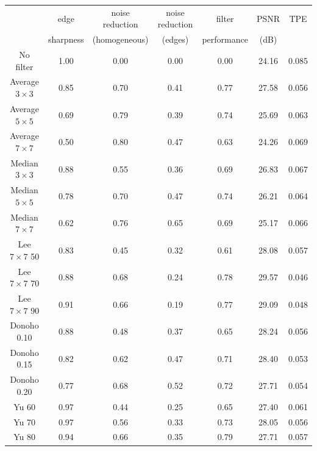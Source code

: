 \documentclass[12pt]{report}
\renewcommand{\baselinestretch}{1.5}
\begin{document}
\begin{table}[p]
\setlength{\abovecaptionskip}{-0.25cm}
\renewcommand{\baselinestretch}{1.0}
\begin{center}
\begin{scriptsize}
\begin{tabular}{|c|c|c|c|c|c|c|} \hline
			& edge		& noise reduction & noise reduction 	& filter& PSNR 		& TPE	\\
			& sharpness	& (homogeneous)	  & (edges)		& performance & (dB)	&	\\ \hline \hline

No filter		& 1.00	& 0.00		& 0.00		& 0.00	& 24.16		& 0.085		\\ \hline \hline

Average $3 \times 3$	& 0.85	& 0.70		& 0.41		& 0.77	& 27.58		& 0.056		\\ \hline
Average $5 \times 5$	& 0.69	& 0.79		& 0.39		& 0.74	& 25.69		& 0.063		\\ \hline
Average $7 \times 7$	& 0.50	& 0.80		& 0.47		& 0.63	& 24.26		& 0.069		\\ \hline \hline

Median $3 \times 3$	& 0.88	& 0.55		& 0.36		& 0.69	& 26.83		& 0.067		\\ \hline
Median $5 \times 5$	& 0.78	& 0.70		& 0.47		& 0.74	& 26.21		& 0.064		\\ \hline
Median $7 \times 7$	& 0.62	& 0.76		& 0.65		& 0.69	& 25.17		& 0.066		\\ \hline \hline 

Lee $7 \times 7$ 50 	& 0.83	& 0.45		& 0.32		& 0.61	& 28.08		& 0.057		\\ \hline 	
Lee $7 \times 7$ 70	& 0.88	& 0.68		& 0.24		& 0.78	& 29.57		& 0.046		\\ \hline
Lee $7 \times 7$ 90	& 0.91	& 0.66		& 0.19		& 0.77	& 29.09		& 0.048		\\ \hline \hline

Donoho 0.10		& 0.88	& 0.48		& 0.37		& 0.65	& 28.24		& 0.056		\\ \hline
Donoho 0.15		& 0.82	& 0.62		& 0.47		& 0.71	& 28.40		& 0.053		\\ \hline
Donoho 0.20		& 0.77	& 0.68		& 0.52		& 0.72	& 27.71		& 0.054		\\ \hline \hline

Yu 60			& 0.97	& 0.44		& 0.25		& 0.65	& 27.40		& 0.061		\\ \hline
Yu 70			& 0.97	& 0.56		& 0.33		& 0.73	& 28.05		& 0.056		\\ \hline
Yu 80			& 0.94	& 0.66		& 0.35		& 0.79	& 27.71		& 0.057		\\ \hline \hline


\end{tabular}
\end{scriptsize}
\end{center}
\end{table}
\end{document}
